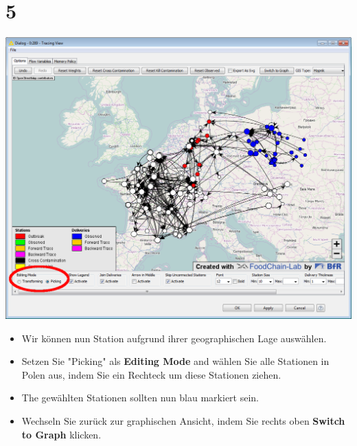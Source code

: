 \documentclass{beamer}
\begin{document}
\section{5}
\begin{frame}
	\begin{center}
  		\includegraphics[height=0.5\textheight]{5.png}
	\end{center}
	\begin{itemize}
		\item Wir können nun Station aufgrund ihrer geographischen Lage auswählen.
		\item Setzen Sie "Picking" als \textbf{Editing Mode} and wählen Sie alle Stationen in Polen aus, indem Sie ein Rechteck um diese Stationen ziehen.
		\item The gewählten Stationen sollten nun blau markiert sein.
		\item Wechseln Sie zurück zur graphischen Ansicht, indem Sie rechts oben \textbf{Switch to Graph} klicken.
	\end{itemize}
\end{frame}
\end{document}
